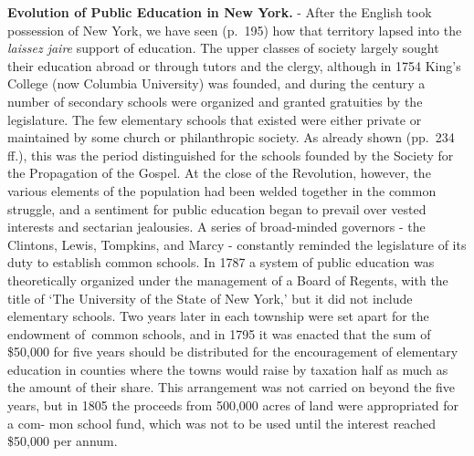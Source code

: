 \documentclass[
]{book}
\begin{document}
\textbf{Evolution of Public Education in New York.} - After the English took possession of New York, we have seen (p.~195) how that territory lapsed into the \emph{laissez jaire} support of education. The upper classes of society largely sought their education abroad or through tutors and the clergy, although in 1754 King's College (now Columbia University) was founded, and during the century a number of secondary schools were organized and granted gratuities by the legislature. The few elementary schools that existed were either private or maintained by some church or philanthropic society. As already shown (pp.~234 ff.), this was the period distinguished for the schools founded by the Society for the Propagation of the Gospel. At the close of the Revolution, however, the various elements of the population had been welded together in the common struggle, and a sentiment for public education began to prevail over vested interests and sectarian jealousies. A series of broad-minded governors - the Clintons, Lewis, Tompkins, and Marcy - constantly reminded the legislature of its duty to establish common schools. In 1787 a system of public education was theoretically organized under the management of a Board of Regents, with the title of `The University of the State of New York,' but it did not include elementary schools. Two years later in each township were set apart for the endowment of~common schools, and in 1795 it was enacted that the sum of \$50,000 for five years should be distributed for the encouragement of elementary education in counties where the towns would raise by taxation half as much as the amount of their share. This arrangement was not carried on beyond the five years, but in 1805 the proceeds from 500,000 acres of land were appropriated for a com- mon school fund, which was not to be used until the interest reached \$50,000 per annum.
\end{document}
